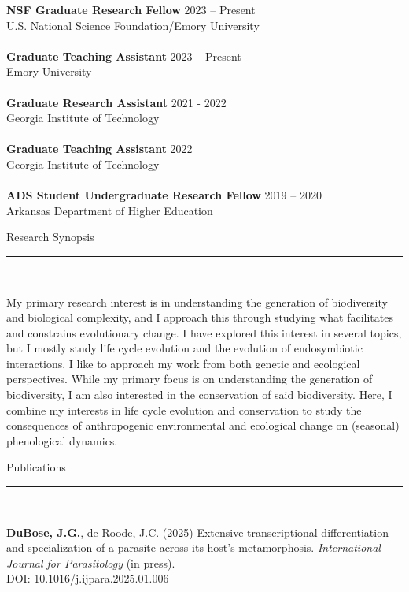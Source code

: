 \documentclass{article}
\begin{document}
\textbf{NSF Graduate Research Fellow} \hfill 2023 – Present \\
U.S. National Science Foundation/Emory University
\\
\\
\textbf{Graduate Teaching Assistant} \hfill 2023 – Present \\
Emory University
\\
\\
\textbf{Graduate Research Assistant} \hfill 2021 - 2022 \\
Georgia Institute of Technology
\\
\\
\textbf{Graduate Teaching Assistant} \hfill 2022 \\
Georgia Institute of Technology
\\
\\
\textbf{ADS Student Undergraduate Research Fellow} \hfill 2019 – 2020 \\
Arkansas Department of Higher Education
\\
\begin{flushleft}
{\Large Research Synopsis} \rule{16.51cm}{0.4pt}\\
\end{flushleft}
My primary research interest is in understanding the generation of biodiversity and biological complexity,
and I approach this through studying what facilitates and constrains evolutionary change. I have explored
this interest in several topics, but I mostly study life cycle evolution and the evolution of endosymbiotic
interactions. I like to approach my work from both genetic and ecological perspectives. While my primary
focus is on understanding the generation of biodiversity, I am also interested in the conservation of said 
biodiversity. Here, I combine my interests in life cycle evolution and conservation to study the consequences
of anthropogenic environmental and ecological change on (seasonal) phenological dynamics. 
\\

\pagebreak

\begin{flushleft}
{\Large Publications} \rule{16.51cm}{0.4pt}\\
\end{flushleft}

\hangindent=0.7cm \textbf{DuBose, J.G.}, de Roode, J.C. (2025) Extensive transcriptional differentiation and specialization of a parasite across its host's metamorphosis. \emph{International Journal for Parasitology} (in press). \\
DOI: 10.1016/j.ijpara.2025.01.006 \\
\end{document}
